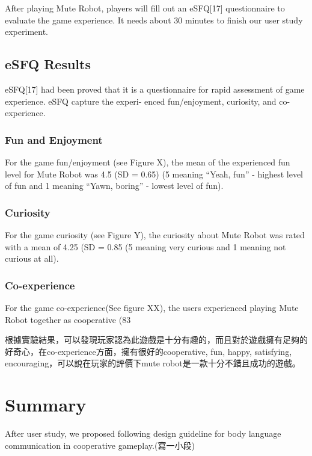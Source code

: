 \documentclass{sigchi}
\begin{document}
After playing Mute Robot, players will fill out an eSFQ[17] questionnaire to evaluate the game experience. It needs about 30 minutes to finish our user study experiment. 

\subsection{eSFQ Results}

eSFQ[17] had been proved that it is a questionnaire for rapid assessment of game experience. eSFQ capture the experi- enced fun/enjoyment, curiosity, and co-experience. 


\subsubsection{Fun and Enjoyment}
For the game fun/enjoyment (see Figure X), the mean of the experienced fun level for Mute Robot was 4.5 (SD = 0.65) (5 meaning “Yeah, fun” - highest level of fun and 1 meaning “Yawn, boring” - lowest level of fun). 

\subsubsection{Curiosity}
For the game curiosity (see Figure Y), the curiosity about Mute Robot was rated with a mean of 4.25 (SD = 0.85 (5 meaning very curious and 1 meaning not curious at all).

\subsubsection{Co-experience}

For the game co-experience(See figure XX), the users experienced playing Mute Robot together as cooperative (83%


根據實驗結果，可以發現玩家認為此遊戲是十分有趣的，而且對於遊戲擁有足夠的好奇心，在co-experience方面，擁有很好的cooperative, fun, happy, satisfying, encouraging，可以說在玩家的評價下mute robot是一款十分不錯且成功的遊戲。

\section{Summary}

After user study, we proposed following design guideline for body language communication in cooperative gameplay.(寫一小段)
\end{document}
